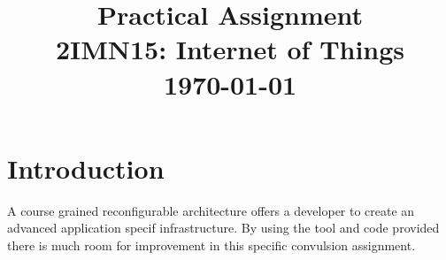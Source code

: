 \documentclass[conference]{IEEEtran}
\begin{document}
\title{Practical Assignment\\ {\fontsize{13}{0}\selectfont 2IMN15: Internet of Things } \\ {\fontsize{13}{0}\selectfont \today}}

\author{
	\and
	}
\maketitle

\IEEEpeerreviewmaketitle

\section{Introduction}

A course grained reconfigurable architecture offers a developer to create an advanced application specif infrastructure. By using the tool and code provided there is much room for improvement in this specific convulsion assignment. 


\end{document}
